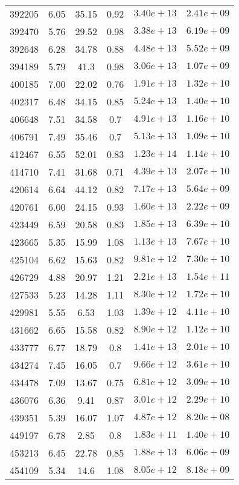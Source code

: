 \begin{table}
\begin{tabular}{cccccc}
392205 & 6.05 & 35.15 & 0.92 & $3.40e+13$ & $2.41e+09$ \\
392470 & 5.76 & 29.52 & 0.98 & $3.38e+13$ & $6.19e+09$ \\
392648 & 6.28 & 34.78 & 0.88 & $4.48e+13$ & $5.52e+09$ \\
394189 & 5.79 & 41.3 & 0.98 & $3.06e+13$ & $1.07e+09$ \\
400185 & 7.00 & 22.02 & 0.76 & $1.91e+13$ & $1.32e+10$ \\
402317 & 6.48 & 34.15 & 0.85 & $5.24e+13$ & $1.40e+10$ \\
406648 & 7.51 & 34.58 & 0.7 & $4.91e+13$ & $1.16e+10$ \\
406791 & 7.49 & 35.46 & 0.7 & $5.13e+13$ & $1.09e+10$ \\
412467 & 6.55 & 52.01 & 0.83 & $1.23e+14$ & $1.14e+10$ \\
414710 & 7.41 & 31.68 & 0.71 & $4.39e+13$ & $2.07e+10$ \\
420614 & 6.64 & 44.12 & 0.82 & $7.17e+13$ & $5.64e+09$ \\
420761 & 6.00 & 24.15 & 0.93 & $1.60e+13$ & $2.22e+09$ \\
423449 & 6.59 & 20.58 & 0.83 & $1.85e+13$ & $6.39e+10$ \\
423665 & 5.35 & 15.99 & 1.08 & $1.13e+13$ & $7.67e+10$ \\
425104 & 6.62 & 15.63 & 0.82 & $9.81e+12$ & $7.30e+10$ \\
426729 & 4.88 & 20.97 & 1.21 & $2.21e+13$ & $1.54e+11$ \\
427533 & 5.23 & 14.28 & 1.11 & $8.30e+12$ & $1.72e+10$ \\
429981 & 5.55 & 6.53 & 1.03 & $1.39e+12$ & $4.11e+10$ \\
431662 & 6.65 & 15.58 & 0.82 & $8.90e+12$ & $1.12e+10$ \\
433777 & 6.77 & 18.79 & 0.8 & $1.41e+13$ & $2.01e+10$ \\
434274 & 7.45 & 16.05 & 0.7 & $9.66e+12$ & $3.61e+10$ \\
434478 & 7.09 & 13.67 & 0.75 & $6.81e+12$ & $3.09e+10$ \\
436076 & 6.36 & 9.41 & 0.87 & $3.01e+12$ & $2.29e+10$ \\
439351 & 5.39 & 16.07 & 1.07 & $4.87e+12$ & $8.20e+08$ \\
449197 & 6.78 & 2.85 & 0.8 & $1.83e+11$ & $1.40e+10$ \\
453213 & 6.45 & 22.78 & 0.85 & $1.88e+13$ & $6.06e+09$ \\
454109 & 5.34 & 14.6 & 1.08 & $8.05e+12$ & $8.18e+09$ \\

\end{tabular}
\end{table}
